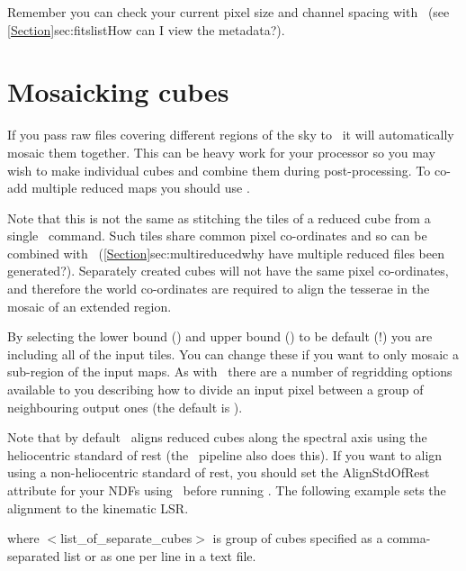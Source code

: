 \documentclass[11pt,oneside,chapters]{starlink}
\providecommand{\att}[1]{\textsf{#1}}
\begin{document}
Remember you can check your current pixel size and channel spacing
with \ndftrace\ (see \cref{Section}{sec:fitslist}{How can I view the
metadata?}).

\section{Mosaicking cubes}
\label{sec:mosaic}

If you pass raw files covering different regions of the sky to
\makecube\ it will automatically mosaic them together. This can be
heavy work for your processor so you may wish to make individual cubes
and combine them during post-processing. To co-add multiple reduced
maps you should use \wcsmosaic.

Note that this is not the same as stitching the tiles of a reduced cube
from a single \makecube\ command.  Such tiles share common pixel
co-ordinates and so can be combined with \paste\
(\cref{Section}{sec:multireduced}{why have multiple reduced files been
generated?}). Separately created
cubes will not have the same pixel co-ordinates, and therefore the
world co-ordinates are required to align the tesserae in the mosaic of
an extended region.

\begin{terminalv}
\end{terminalv}
By selecting the lower bound () and upper bound
() to be default (!) you are including all of the input
tiles. You can change these if you want to only mosaic a sub-region of
the input maps. As with \makecube\ there are a number of regridding
options available to you describing how to divide an input pixel
between a group of neighbouring output ones (the default is
).

Note that by default \wcsmosaic\ aligns reduced cubes along the
spectral axis using the heliocentric standard of rest (the \ORACDR\
pipeline also does this).  If you want to align using
a non-heliocentric standard of rest, you should set the
\att{AlignStdOfRest} attribute for your NDFs using \wcsattrib\
before running \wcsmosaic.
The following example sets the alignment to the kinematic LSR.

\begin{terminalv}
\end{terminalv}

where $<$list\_of\_separate\_cubes$>$ is group of cubes specified
as a comma-separated list or as one per line in a text file.
\end{document}
